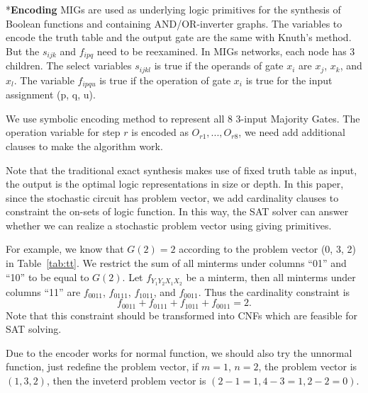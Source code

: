 \documentclass[conference,letterpaper]{IEEEtran}
\makeatletter
\renewcommand{\subsection}{\@startsection{subsection}{1}{0mm}
	{-\baselineskip}{0.001\baselineskip}{\bf\leftline}}
\makeatother
\begin{document}
\subsection*{\textbf{Encoding }}
MIGs are used as underlying logic primitives for the synthesis of Boolean functions and containing AND/OR-inverter graphs. The variables to encode the truth table and the output gate are the same with Knuth’s method. 
But the ${s}_{i j k}$ and $f_{i p q}$ need to be reexamined. In MIGs networks, each node has 3 children. The select variables ${s}_{i j k l}$ is true if the operands of gate $x_{i}$ are $x_{j}$, $x_{k}$, and $x_{l}$.  The
variable $f_{i p q u}$ is true if the operation of gate $x_{i}$ is true for the input assignment (p, q, u).

We use symbolic encoding method to represent all 8 3-input Majority Gates. The operation variable for step $r$ is encoded as $O_{r 1},...,O_{r 8}$, we need add additional  clauses to make the algorithm work.



Note that the traditional exact synthesis makes use of fixed truth table as input, the output is the optimal logic representations in size or depth.
In this paper, since the stochastic circuit has problem vector, we add cardinality clauses to constraint the on-sets of logic function. In this way, the SAT solver can answer whether we can realize a stochastic problem vector using giving primitives. 

For example, we know that $G(2) = 2$ according to the problem vector (0, 3, 2) in Table~\ref{tab:tt}. We restrict the sum of all minterms under columns ``01'' and ``10'' to be equal to $G(2)$. 
Let $f_{Y_1Y_2X_1X_2}$ be a minterm, then all minterms under columns ``11''
are $f_{0011}$, $f_{0111}$, $f_{1011}$, and $f_{0011}$.
Thus the cardinality constraint is \vspace{-0.5ex}
\begin{equation}
f_{0011} + f_{0111} + f_{1011} + f_{0011} = 2.
\end{equation}
Note that this constraint should be transformed into CNFs which are feasible for SAT solving.

Due to the encoder works for normal function, we should also try the unnormal function, just redefine the problem vector, if $m = 1$, $n = 2$, the problem vector is $(1,3,2)$, then the inveterd problem vector is $(2-1=1, 4-3=1, 2-2=0)$.


\end{document}
